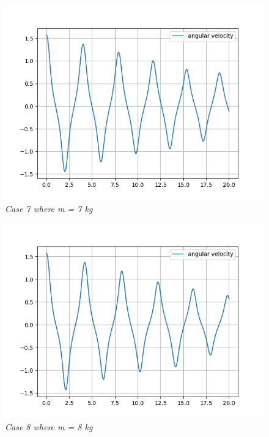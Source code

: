         \begin{figure}[H]
            \centering
            \includegraphics{Appendix/RSimPictures/A/am7.png}
            \caption{\textit{Case 7 where m = 7 kg}}
            \label{}
        \end{figure}
            
        \begin{figure}[H]
            \centering
            \includegraphics{Appendix/RSimPictures/A/am8.png}
            \caption{\textit{Case 8 where m = 8 kg}}
            \label{}
        \end{figure}
            
